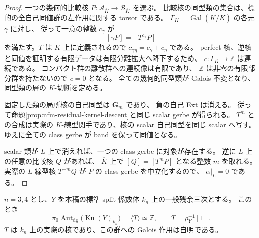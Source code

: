 \begin{proof}
一つの幾何的比較核 $P:\mathcal A_{\overline K}\to\mathcal B_{\overline K}$ を選ぶ。
比較核の同型類の集合は、標的の全自己同値群の左作用に関する torsor である。
$\Gamma_K=\operatorname{Gal}(\overline K/K)$ の各元 $\gamma$ に対し、
従って一意の整数 $c_\gamma$ が
\[
 [\gamma P]=[T^{c_\gamma}P]
\]
を満たす。$T$ は $K$ 上に定義されるので
$c_{\gamma\eta}=c_\gamma+c_\eta$ である。
perfect 核、逆核と同値を証明する有限データは有限分離拡大へ降下するため、
$c:\Gamma_K\to\mathbb Z$ は連続である。
コンパクト群の離散群への連続像は有限であり、
$\mathbb Z$ は非零の有限部分群を持たないので $c=0$ となる。
全ての幾何的同型類が Galois 不変となり、同型類の層の $K$-切断を定める。

固定した類の局所核の自己同型は $\mathbf G_m$ であり、
負の自己 Ext は消える。
従って命題\ref{prop:nfm-residual-kernel-descent}と同じ scalar gerbe が得られる。
$T^m$ との合成は実際の $K$-線型関手であり、核の scalar 自己同型を同じ scalar へ写す。
ゆえに全ての class gerbe が band を保って同値となる。

scalar 類が $L$ 上で消えれば、一つの class gerbe に対象が存在する。
逆に $L$ 上の任意の比較核 $Q$ があれば、
$\overline K$ 上で $[Q]=[T^mP]$ となる整数 $m$ を取れる。
実際の $L$-線型核 $T^{-m}Q$ が $P$ の class gerbe を中立化するので、
$\alpha|_L=0$ である。
\end{proof}

\begin{proposition}
\label{prop:nfm-generic-low-dimensional-kernel-aut}
$n=3,4$ とし、$Y$ を本稿の標準 split 係数体 $k_n$ 上の一般残余三次とする。
このとき
\[
 \pi_0\operatorname{Aut}_{\mathrm{dg}}
       \bigl(\operatorname{Ku}(Y)_{\overline{k_n}}\bigr)
       =\langle T\rangle\simeq\mathbb Z,
 \qquad T=\rho_Y^{-1}[1].
\]
$T$ は $k_n$ 上の実際の核であり、この群への Galois 作用は自明である。
\end{proposition}

